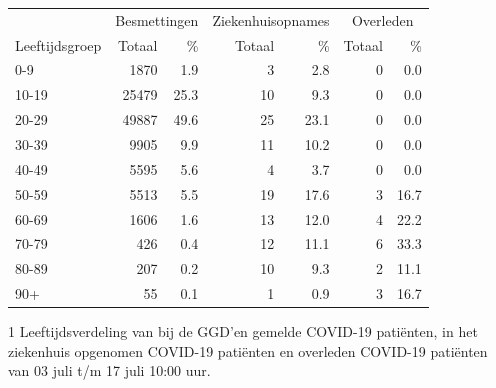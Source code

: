 \documentclass[
  english,
  man,floatsintext]{apa6}
\begin{document}
\begin{table}
\centering\begingroup\fontsize{11}{13}\selectfont

\begin{threeparttable}
\begin{tabular}{lrrrrrr}
\toprule
\multicolumn{1}{c}{ } & \multicolumn{2}{c}{Besmettingen} & \multicolumn{2}{c}{Ziekenhuisopnames} & \multicolumn{2}{c}{Overleden} \\
\cmidrule(l{3pt}r{3pt}){2-3} \cmidrule(l{3pt}r{3pt}){4-5} \cmidrule(l{3pt}r{3pt}){6-7}
Leeftijdsgroep & Totaal & \% & Totaal & \% & Totaal & \%\\
\midrule
0-9 & 1870 & 1.9 & 3 & 2.8 & 0 & 0.0\\
10-19 & 25479 & 25.3 & 10 & 9.3 & 0 & 0.0\\
20-29 & 49887 & 49.6 & 25 & 23.1 & 0 & 0.0\\
30-39 & 9905 & 9.9 & 11 & 10.2 & 0 & 0.0\\
40-49 & 5595 & 5.6 & 4 & 3.7 & 0 & 0.0\\
50-59 & 5513 & 5.5 & 19 & 17.6 & 3 & 16.7\\
60-69 & 1606 & 1.6 & 13 & 12.0 & 4 & 22.2\\
70-79 & 426 & 0.4 & 12 & 11.1 & 6 & 33.3\\
80-89 & 207 & 0.2 & 10 & 9.3 & 2 & 11.1\\
90+ & 55 & 0.1 & 1 & 0.9 & 3 & 16.7\\
\bottomrule
\end{tabular}
\begin{tablenotes}
\item[1] Leeftijdsverdeling van bij de GGD’en gemelde COVID-19 patiënten, in het ziekenhuis opgenomen COVID-19 patiënten en overleden COVID-19 patiënten van 03 juli t/m 17 juli 10:00 uur.
\end{tablenotes}
\end{threeparttable}
\endgroup{}
\end{table}

\newpage
\end{document}
